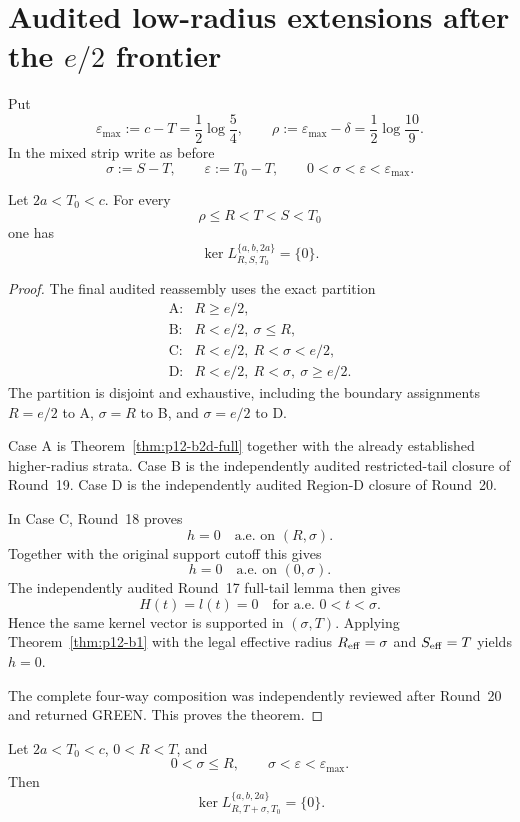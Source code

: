 \section{Audited low-radius extensions after the \texorpdfstring{$e/2$}{e/2} frontier}
\label{sec:p12-low-radius-post-r23}

Put
\[
\varepsilon_{\max}:=c-T=\frac12\log\frac54,
\qquad
\rho:=\varepsilon_{\max}-\delta
=\frac12\log\frac{10}{9}.
\]
In the mixed strip write as before
\[
\sigma:=S-T,
\qquad
\varepsilon:=T_0-T,
\qquad
0<\sigma<\varepsilon<\varepsilon_{\max}.
\]

\begin{theorem}
\label{thm:p12-rho-descent}
Let \(2a<T_0<c\). For every
\[
\rho\le R<T<S<T_0
\]
one has
\[
\boxed{
\ker L_{R,S,T_0}^{\{a,b,2a\}}=\{0\}.
}
\]
\end{theorem}

\begin{proof}
The final audited reassembly uses the exact partition
\[
\begin{array}{ll}
\text{A:}&R\ge e/2,\\
\text{B:}&R<e/2,\ \sigma\le R,\\
\text{C:}&R<e/2,\ R<\sigma<e/2,\\
\text{D:}&R<e/2,\ R<\sigma,\ \sigma\ge e/2.
\end{array}
\]
The partition is disjoint and exhaustive, including the boundary
assignments \(R=e/2\) to A, \(\sigma=R\) to B, and \(\sigma=e/2\) to D.

Case A is Theorem~\ref{thm:p12-b2d-full} together with the already
established higher-radius strata. Case B is the independently audited
restricted-tail closure of Round~19. Case D is the independently audited
Region-D closure of Round~20.

In Case C, Round~18 proves
\[
h=0\quad\text{a.e. on }(R,\sigma).
\]
Together with the original support cutoff this gives
\[
h=0\quad\text{a.e. on }(0,\sigma).
\]
The independently audited Round~17 full-tail lemma then gives
\[
H(t)=l(t)=0\quad\text{for a.e. }0<t<\sigma.
\]
Hence the same kernel vector is supported in \((\sigma,T)\). Applying
Theorem~\ref{thm:p12-b1} with the legal effective radius
\(R_{\rm eff}=\sigma\) and \(S_{\rm eff}=T\) yields \(h=0\).

The complete four-way composition was independently reviewed after
Round~20 and returned GREEN. This proves the theorem.
\end{proof}

\begin{theorem}
\label{thm:p12-restricted-tail-all-r}
Let \(2a<T_0<c\), \(0<R<T\), and
\[
0<\sigma\le R,
\qquad
\sigma<\varepsilon<\varepsilon_{\max}.
\]
Then
\[
\boxed{
\ker L_{R,T+\sigma,T_0}^{\{a,b,2a\}}=\{0\}.
}
\]
\end{theorem}

